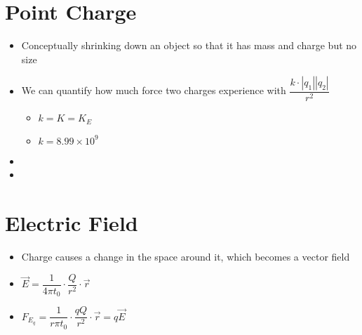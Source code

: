 \documentclass{article}
\begin{document}
\section{Point Charge}
\begin{itemize}
  \item Conceptually shrinking down an object so that it has mass and charge but no size
  \item We can quantify how much force two charges experience with $\dfrac{k\cdot|q_1||q_2|}{r^2}$
    \begin{itemize}
      \item $k=K=K_E$
      \item $k=8.99\times 10 ^{9}$
    \end{itemize}
  \item {}
  \item {}
\end{itemize}
\section{Electric Field}
\begin{itemize}
  \item Charge causes a change in the space around it, which becomes a vector field
  \item $\vec{E}=\dfrac{1}{4\pi t_0}\cdot\dfrac{Q}{r^2}\cdot\vec{r}$
  \item $F_{E_q}=\dfrac{1}{r\pi t_0}\cdot\dfrac{qQ}{r^2}\cdot\vec{r}=q\vec{E}$
\end{itemize}
\end{document}
